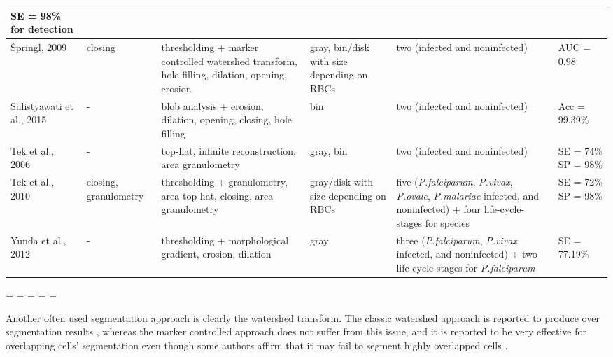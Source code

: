 \documentclass[sensors,review,accept,moreauthors,pdftex,10pt,a4paper]{mdpi}
\begin{document}
\begin{table}[H]
\begin{tabular}{m{3cm}<{\centering}m{3cm}<{\centering}m{5cm}<{\centering}m{3cm}<{\centering}m{5cm}<{\centering}m{2cm}<{\centering}}
    	SE = 98\% for detection
    \\
    \midrule
{\v{S}}pringl, 2009  &
    	closing &
    	thresholding + marker controlled watershed transform, hole filling, dilation, opening, erosion  &
    	gray, bin/disk with size depending on RBCs &
    	two (infected and noninfected) &
    	AUC = 0.98
    \\
    \midrule
    Sulistyawati et al., 2015  &
    	- &
    	blob analysis + erosion, dilation, opening, closing, hole filling  &
    	bin &
    	two (infected and noninfected) &
    	Acc = 99.39\%
    \\
    \midrule
 Tek et al., 2006  &
    	- &
    	top-hat, infinite reconstruction, area granulometry  &
    	gray, bin &
    	two (infected and noninfected) &
    	SE = 74\% SP = 98\%
    \\
    \midrule
    Tek et al., 2010  &
    	closing, granulometry &
    	thresholding + granulometry, area top-hat, closing, area granulometry &
    	gray/disk with size depending on RBCs &
    	five (\emph{P.falciparum}, \emph{P.vivax}, \emph{P.ovale}, \emph{P.malariae} infected, and noninfected) +
    four life-cycle-stages for species &
    	SE = 72\% SP = 98\%
    \\
    \midrule
    Yunda et al., 2012  &
    	- &
    	thresholding + morphological gradient, erosion, dilation  &
    	gray &
    	three (\emph{P.falciparum}, \emph{P.vivax} infected, and noninfected) + two life-cycle-stages for \emph{P.falciparum}&
    	SE = 77.19\% \\
    	  	
		 \bottomrule
		\end{tabular}
	\end{table}

\newpage
\restoregeometry
\paperwidth=\pdfpageheight
\paperheight=\pdfpagewidth
\pdfpageheight=\paperheight
\pdfpagewidth=\paperwidth
\headwidth=\textwidth



Another often used segmentation approach is clearly the watershed transform. The classic watershed approach is reported to produce over segmentation results \cite{Savkare2011b}, whereas the marker controlled approach does not suffer from this issue, and it is reported to be very effective for overlapping cells' segmentation even though some authors affirm that it may fail to segment highly overlapped cells  \cite{Das2011,Das2013,Das2014,Das2015,Devi2017,Khan2011,Romero2016,Savkare2015,Savkare2011a,Springl2009}.
\end{document}
